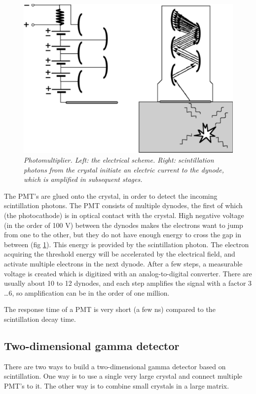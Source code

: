 \begin{figure}[tb]
\centering
\includegraphics[width=\figone]{figs/fig_jnpmt.pdf}
\caption{\label{fig:jnpmt} \emph{Photomultiplier. Left: the electrical scheme.
Right: scintillation photons from the crystal initiate an electric current to
the dynode, which is amplified in subsequent stages.}}
\end{figure}

The PMT's are glued onto the crystal, in order to detect the incoming
scintillation photons. The PMT consists of multiple dynodes, the first of
which (the photocathode) is in optical contact with the crystal. High negative
voltage (in the order of 100 V) between the dynodes makes the electrons want
to jump from one to the other, but they do not have enough energy to cross the
gap in between (fig \ref{fig:jnpmt}).  This energy is provided by the
scintillation photon. The electron acquiring the threshold energy will be
accelerated by the electrical field, and activate multiple electrons in the
next dynode. After a few steps, a measurable voltage is created which is
digitized with an analog-to-digital converter. There are usually about 10 to
12 dynodes, and each step amplifies the signal with a factor 3 \ldots 6, so
amplification can be in the order of one million.

The response time of a PMT is very short (a few ns) compared to the
scintillation decay time.


\subsection{Two-dimensional gamma detector}
%
There are two ways to build a two-dimensional gamma detector based on
scintillation. One way is to use a single very large crystal and connect
multiple PMT's to it. The other way is to combine small crystals in a
large matrix.

